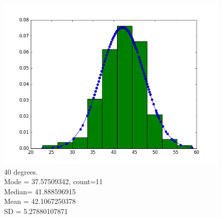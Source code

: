 \documentclass[12pt]{article}
\numberwithin{figure}{section}
\numberwithin{table}{section}
\begin{document}
\begin{figure}[H]
\begin{minipage}[b]{0.4\textwidth}
    \includegraphics[width=\textwidth]{angle40.png}
    \caption[Estimation at angle 40 degrees]{40 degrees.
    \\\hspace{\textwidth}Mode   = 37.57509342, count=11
	\\\hspace{\textwidth}	Median= 41.888596915
	\\\hspace{\textwidth}	Mean   = 42.1067250378
	\\\hspace{\textwidth}	SD       = 5.27880107871}
  \end{minipage}
\end{figure} 
\end{document}
